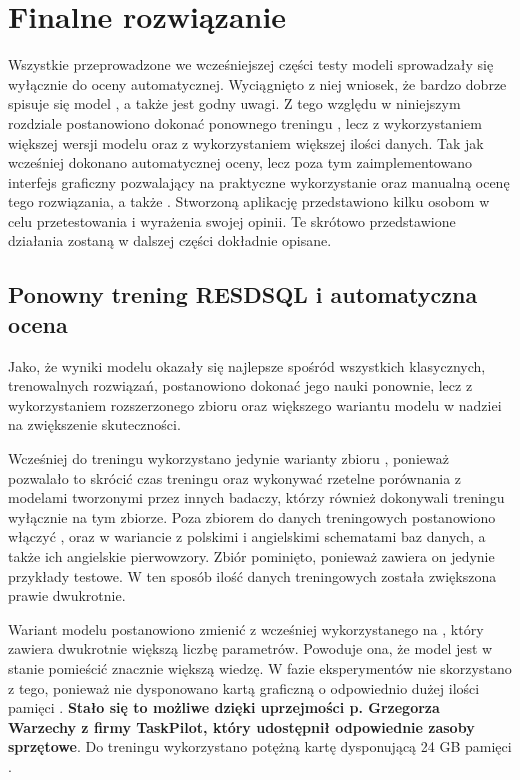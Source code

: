\chapter{Finalne rozwiązanie}
Wszystkie przeprowadzone we wcześniejszej części testy modeli sprowadzały się wyłącznie do oceny automatycznej. Wyciągnięto z niej wniosek, że bardzo dobrze spisuje się model , a  także jest godny uwagi. Z tego względu w niniejszym rozdziale postanowiono dokonać ponownego treningu , lecz z wykorzystaniem większej wersji modelu  oraz z wykorzystaniem większej ilości danych. Tak jak wcześniej dokonano automatycznej oceny, lecz poza tym zaimplementowano interfejs graficzny pozwalający na praktyczne wykorzystanie oraz manualną ocenę tego rozwiązania, a także . Stworzoną aplikację przedstawiono kilku osobom w celu przetestowania i wyrażenia swojej opinii. Te skrótowo przedstawione działania zostaną w dalszej części dokładnie opisane.

\section{Ponowny trening RESDSQL i automatyczna ocena}
Jako, że wyniki modelu  okazały się najlepsze spośród wszystkich klasycznych, trenowalnych rozwiązań, postanowiono dokonać jego nauki ponownie, lecz z wykorzystaniem rozszerzonego zbioru oraz większego wariantu modelu  w nadziei na zwiększenie skuteczności.

Wcześniej do treningu wykorzystano jedynie warianty zbioru , ponieważ pozwalało to skrócić czas treningu oraz wykonywać rzetelne porównania z modelami tworzonymi przez innych badaczy, którzy również dokonywali treningu wyłącznie na tym zbiorze. Poza zbiorem  do danych treningowych postanowiono włączyć ,  oraz  w wariancie z polskimi i angielskimi schematami baz danych, a także ich angielskie pierwowzory. Zbiór  pominięto, ponieważ zawiera on jedynie przykłady testowe. W ten sposób ilość danych treningowych została zwiększona prawie dwukrotnie.

Wariant modelu  postanowiono zmienić z wcześniej wykorzystanego  na , który zawiera dwukrotnie większą liczbę parametrów. Powoduje ona, że model jest w stanie pomieścić znacznie większą wiedzę. W fazie eksperymentów nie skorzystano z tego, ponieważ nie dysponowano kartą graficzną o odpowiednio dużej ilości pamięci . \textbf{Stało się to możliwe dzięki uprzejmości p. Grzegorza Warzechy z firmy TaskPilot, który udostępnił odpowiednie zasoby sprzętowe}. Do treningu wykorzystano potężną kartę  dysponującą 24 GB pamięci .

